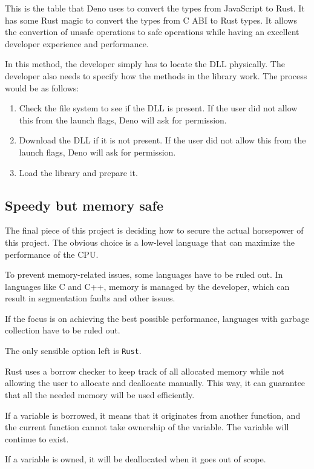 \documentclass[10pt,journal,compsoc]{IEEEtran}
\begin{document}
This is the table that Deno uses to convert the types from JavaScript to Rust. It has some Rust magic to convert the types from C ABI to Rust types. It allows the convertion of unsafe operations to safe operations while having an excellent developer experience and performance.

In this method, the developer simply has to locate the DLL physically. The developer also needs to specify how the methods in the library work.
The process would be as follows:

\begin{enumerate}
    \item Check the file system to see if the DLL is present. If the user did not allow this from the launch flags, Deno will ask for permission.
    \item Download the DLL if it is not present. If the user did not allow this from the launch flags, Deno will ask for permission.
    \item Load the library and prepare it.
\end{enumerate}


\subsection{Speedy but memory safe}

The final piece of this project is deciding how to secure the actual horsepower of this project. The obvious choice is a low-level language that can maximize the performance of the CPU.

To prevent memory-related issues, some languages have to be ruled out. In languages like C and C++, memory is managed by the developer, which can result in segmentation faults and other issues.

If the focus is on achieving the best possible performance, languages with garbage collection have to be ruled out.

The only sensible option left is \verb|Rust|.

Rust uses a borrow checker to keep track of all allocated memory while not allowing the user to allocate and deallocate manually. This way, it can guarantee that all the needed memory will be used efficiently.

If a variable is borrowed, it means that it originates from another function, and the current function cannot take ownership of the variable. The variable will continue to exist.

If a variable is owned, it will be deallocated when it goes out of scope.
\end{document}
